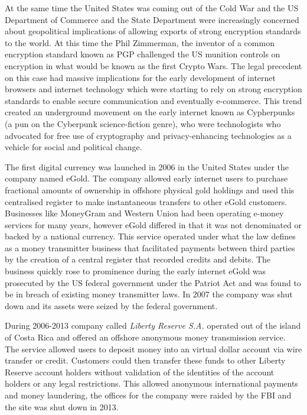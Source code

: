 At the same time the United States was coming out of the Cold War and
the US Department of Commerce and the State Department were increasingly
concerned about geopolitical implications of allowing exports of strong
encryption standards to the world. At this time the Phil Zimmerman, the
inventor of a common encryption standard known as PGP challenged the US
munition controls on encryption in what would be known as the first
Crypto Wars. The legal precedent on this case had massive implications
for the early development of internet browsers and internet technology
which were starting to rely on strong encryption standards to enable
secure communication and eventually e-commerce. This trend created an
underground movement on the early internet known as Cypherpunks (a pun
on the Cyberpunk science-fiction genre), who were technologists who
advocated for free use of cryptography and privacy-enhancing
technologies as a vehicle for social and political change.


The first digital currency was launched in 2006 in the United States under the
company named eGold. The company allowed early internet users to purchase
fractional amounts of ownership in offshore physical gold holdings and used this
centralised register to make instantaneous transfers to other eGold customers.
Businesses like MoneyGram and Western Union had been operating e-money services
for many years, however eGold differed in that it was not denominated or backed
by a national currency.  This service operated under what the law defines as a
money transmitter business that facilitated payments between third parties by
the creation of a central register that recorded credits and debits. The
business quickly rose to prominence during the early internet eGold was
prosecuted by the US federal government under the Patriot Act and was found to
be in breach of existing money transmitter laws. In 2007 the company was shut
down and its assets were seized by the federal government.
\cite{popper2015untold}


During 2006-2013 company called \textit{Liberty Reserve S.A.} operated out of
the island of Costa Rica and offered an offshore anonymous money transmission
service. The service allowed users to deposit money into an virtual dollar
account via wire transfer or credit. Customers could then transfer these funds
to other Liberty Reserve account holders without validation of the identities of
the account holders or any legal restrictions. This allowed anonymous
international payments and money laundering, the offices for the company were
raided by the FBI and the site was shut down in 2013.


